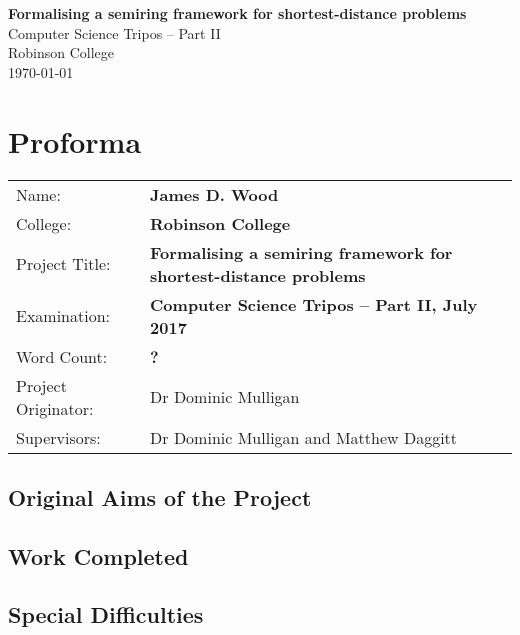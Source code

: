 \documentclass[12pt,a4paper,twoside,openright]{report}
\newcommand{\mytitle}{Formalising a semiring framework for shortest-distance problems}
\begin{document}


\pagestyle{empty}


\vspace*{60mm}
\begin{center}
\Huge
\textbf{\mytitle} \\[5mm]
Computer Science Tripos -- Part II \\[5mm]
Robinson College \\[5mm]
\today  %
\end{center}


\pagestyle{plain}

\chapter*{Proforma}

{\large
\begin{tabularx}{\linewidth}{lX}
Name:               & \bf James D. Wood \\
College:            & \bf Robinson College \\
Project Title:      & \bf \mytitle \\
Examination:        & \bf Computer Science Tripos -- Part II, July 2017  \\
Word Count:         & \bf ? \\
Project Originator: & Dr Dominic Mulligan \\
Supervisors:        & Dr Dominic Mulligan and Matthew Daggitt \\
\end{tabularx}
}


\section*{Original Aims of the Project}

\section*{Work Completed}

\section*{Special Difficulties}
\end{document}
